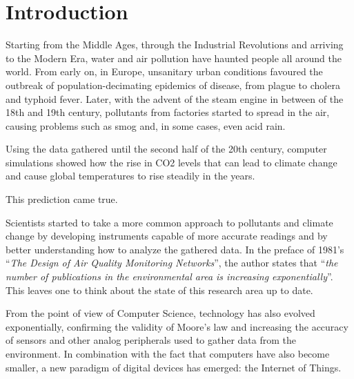 

\chapter{Introduction}\label{chapter:introduction}

	Starting from the Middle Ages, through the Industrial Revolutions and arriving to the Modern Era, water and air pollution have haunted people all around the world.
	From early on, in Europe, unsanitary urban conditions favoured the outbreak of population-decimating epidemics of disease, from plague to cholera and typhoid fever.
	Later, with the advent of the steam engine in between of the 18th and 19th century, pollutants from factories started to spread in the air, causing problems such as smog and, in some cases, even acid rain.
	
	Using the data gathered until the second half of the 20th century, computer simulations showed how the rise in CO2 levels that can lead to climate change and cause global temperatures to rise steadily in the years.
	
	This prediction came true.

	Scientists started to take a more common approach to pollutants and climate change by developing instruments capable of more accurate readings and by better understanding how to analyze the gathered data.
	In the preface of 1981's ``\textit{The Design of Air Quality Monitoring Networks}'', the author states that ``\textit{the number of publications in the environmental area is increasing exponentially}''\cite{airqualitynetworks}.
	This leaves one to think about the state of this research area up to date.
	
	From the point of view of Computer Science, technology has also evolved exponentially, confirming the validity of Moore's law and increasing the accuracy of sensors and other analog peripherals used to gather data from the environment.
	In combination with the fact that computers have also become smaller, a new paradigm of digital devices has emerged: the Internet of Things.
		
